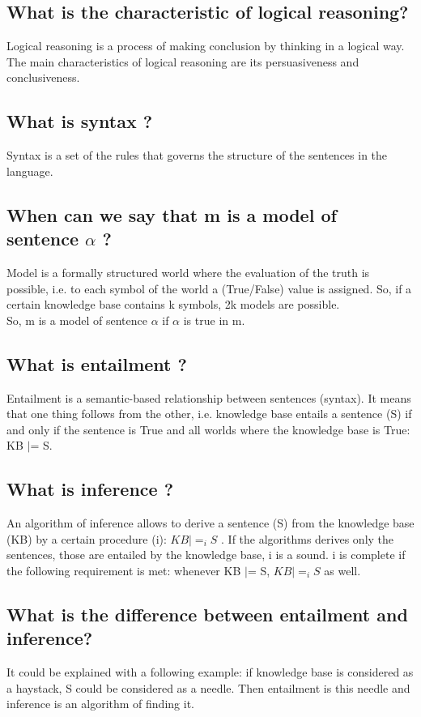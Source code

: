 \documentclass[a4paper, 12pt]{article}
\begin{document}
\subsection{What is the characteristic of logical reasoning?}
Logical reasoning is a process of making conclusion by thinking in a logical way.
The main characteristics of logical reasoning are its persuasiveness and conclusiveness.

\subsection{What is syntax ?}

Syntax is a set of the rules that governs the structure of the sentences in the language.

\subsection{When can we say that m is a model of sentence $\alpha$ ?}

Model is a formally structured world where the evaluation of the truth is possible, i.e. to
each symbol of the world a (True/False) value is assigned. So, if a certain knowledge base contains k symbols, 2k models are possible.\\
So, m is a model of sentence $\alpha$ if $\alpha$ is true in m.

\subsection{What is entailment ?}

Entailment is a semantic-based relationship between sentences (syntax). It means that one thing follows from the other, i.e. knowledge base entails a sentence (S) if and only if the sentence is True and all worlds where the knowledge base is True: KB $|$= S.

\subsection{What is inference ?}

An algorithm of inference allows to derive a sentence (S) from the knowledge base (KB) by a certain procedure (i):  $KB |=_i S$ . If the algorithms derives only the sentences, those are entailed by the knowledge base, i is a sound. i is complete if the following requirement is met: whenever KB $|$= S, $KB |=_i S$ as well.


\subsection{What is the difference between entailment and inference?}

It could be explained with a following example: if knowledge base is considered as a haystack, S could be considered as a needle. Then entailment is this needle and inference is an algorithm of finding it.
\end{document}
